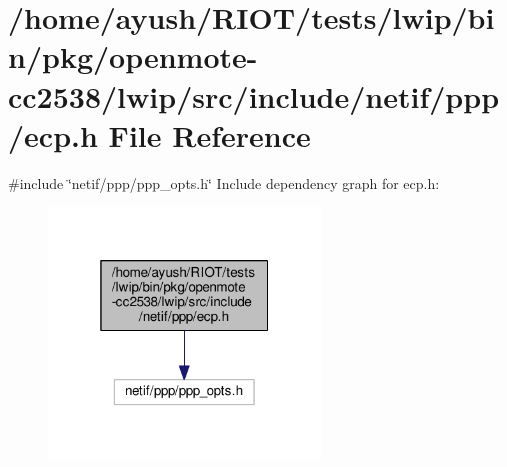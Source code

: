 \hypertarget{openmote-cc2538_2lwip_2src_2include_2netif_2ppp_2ecp_8h}{}\section{/home/ayush/\+R\+I\+O\+T/tests/lwip/bin/pkg/openmote-\/cc2538/lwip/src/include/netif/ppp/ecp.h File Reference}
\label{openmote-cc2538_2lwip_2src_2include_2netif_2ppp_2ecp_8h}
{\ttfamily \#include \char`\"{}netif/ppp/ppp\+\_\+opts.\+h\char`\"{}}\newline
Include dependency graph for ecp.\+h\+:
\nopagebreak
\begin{figure}[H]
\begin{center}
\leavevmode
\includegraphics[width=205pt]{openmote-cc2538_2lwip_2src_2include_2netif_2ppp_2ecp_8h__incl}
\end{center}
\end{figure}
